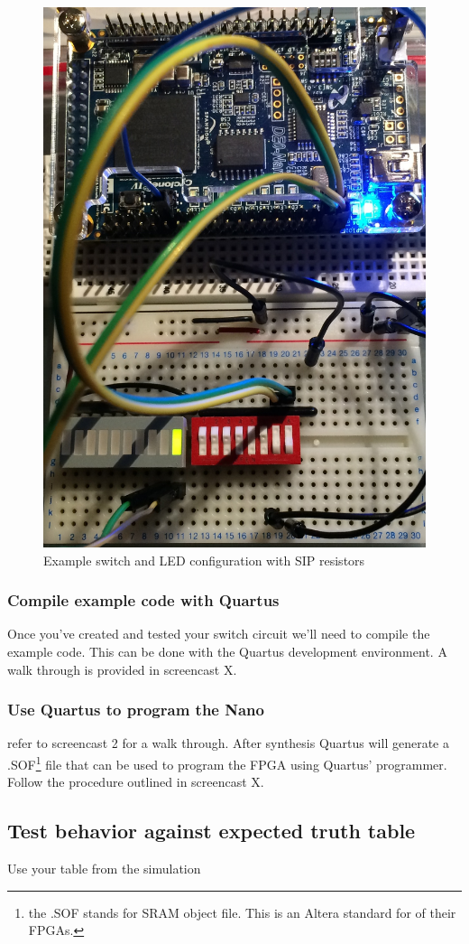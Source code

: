 \documentclass[12pt,journal]{IEEEtran}
\begin{document}
        \begin{figure}[H]
          \includegraphics[width=.48\textwidth]{Images/ExampleLayout.jpg}
          \caption{Example switch and LED configuration with SIP resistors}
        \end{figure}

      \subsubsection{\bfseries Compile example code with Quartus}
        Once you've created and tested your switch circuit we'll need to compile the example code. This can be done
        with the Quartus development environment. A walk through is provided in screencast X. 

      \subsubsection{\bfseries  Use Quartus to program the Nano} refer to screencast 2 for a walk through. After synthesis
      Quartus will generate a .SOF\footnote{the .SOF stands for SRAM object file. This is an Altera standard for
      of their FPGAs.} file that can be used to program the FPGA using Quartus' programmer. Follow the procedure
      outlined in screencast X.
        
      \subsection{\bfseries Test behavior against expected truth table} Use your table from the simulation
\end{document}
